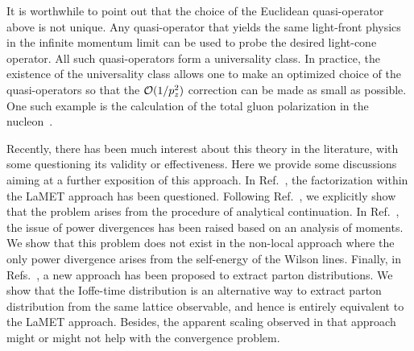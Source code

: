 It is worthwhile to point out that the choice of the Euclidean quasi-operator above is not unique. Any quasi-operator that yields the same light-front physics in the infinite momentum limit can be used to probe the desired light-cone operator. All such quasi-operators form a universality class. In practice, the existence of the universality class allows one to make an optimized choice of the quasi-operators so that the ${\cal O}(1/p_z^2)$ correction can be made as small as possible. One such example is the calculation of the total gluon polarization
in the nucleon~\cite{Hatta:2013gta}.

Recently, there has been much interest about this theory
in the literature, with some questioning its validity or
effectiveness. Here we provide some discussions aiming at a further exposition of this approach.
In Ref.~\cite{Carlson:2017gpk}, the factorization within the LaMET approach has been questioned. Following Ref.~\cite{Briceno:2017cpo},
we explicitly show that the problem arises from the procedure of analytical continuation. In Ref.~\cite{Rossi:2017muf},
the issue of power divergences has been raised based on an analysis of moments. We show that this problem does not exist in the non-local approach
where the only power divergence arises from the self-energy of the Wilson lines.
Finally, in Refs.~\cite{Radyushkin:2017cyf,Orginos:2017kos}, a new approach has been proposed to extract
parton distributions.  We show that the Ioffe-time
distribution is an alternative way to extract
parton distribution from the same lattice observable, and hence is entirely equivalent to the LaMET approach.
Besides, the apparent scaling observed in that approach might or might not help with the convergence problem.
